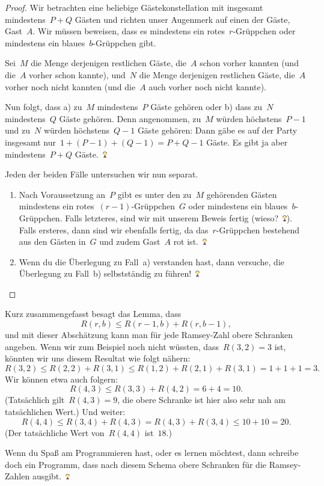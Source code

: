 \documentclass{../../zirkelblatt1718}
\theoremstyle{definition}
\theoremstyle{plain}
\theoremstyle{remark}
\newcommand{\happy}{\includegraphics[height=0.7em]{happy}\xspace}
\begin{document}
\begin{proof}Wir betrachten eine beliebige Gästekonstellation mit insgesamt
mindestens~$P + Q$ Gästen und richten unser Augenmerk auf einen der Gäste,
Gast~$A$. Wir müssen beweisen, dass es mindestens ein rotes~$r$-Grüppchen oder
mindestens ein blaues~$b$-Grüppchen gibt.

Sei~$M$ die Menge derjenigen restlichen Gäste, die~$A$ schon vorher
kannten (und die~$A$ vorher schon kannte), und~$N$ die Menge derjenigen
restlichen Gäste, die~$A$ vorher noch nicht kannten (und die~$A$ auch vorher
noch nicht kannte).

Nun folgt, dass a) zu~$M$ mindestens~$P$ Gäste gehören oder b) dass zu~$N$
mindestens~$Q$ Gäste gehören. Denn angenommen, zu~$M$ würden höchstens~$P-1$
und zu~$N$ würden höchstens~$Q-1$ Gäste gehören: Dann gäbe es auf der Party
insgesamt nur~$1 + (P-1) + (Q-1) = P+Q-1$ Gäste. Es gibt ja aber
mindestens~$P+Q$ Gäste.~\happy

Jeden der beiden Fälle untersuchen wir nun separat.

\begin{enumerate}
\item Nach Voraussetzung an~$P$ gibt es unter den zu~$M$ gehörenden Gästen
mindestens ein rotes~$(r-1)$-Grüppchen~$G$ oder mindestens ein
blaues~$b$-Grüppchen. Falls letzteres, sind wir mit unserem Beweis
fertig (wieso?~\happy). Falls ersteres, dann sind wir ebenfalls fertig, da
das~$r$-Grüppchen bestehend aus den Gästen in~$G$ und zudem Gast~$A$ rot
ist.~\happy
\item Wenn du die Überlegung zu Fall~a) verstanden hast, dann versuche, die
Überlegung zu Fall~b) selbstständig zu führen!~\happy \qedhere
\end{enumerate}
\end{proof}

Kurz zusammengefasst besagt das Lemma, dass
\[ R(r,b) \leq R(r-1,b) + R(r,b-1), \]
und mit dieser Abschätzung kann man für jede Ramsey-Zahl obere Schranken
angeben. Wenn wir zum Beispiel noch nicht wüssten, dass~$R(3,2) = 3$ ist,
könnten wir uns diesem Resultat wie folgt nähern:
\[ R(3,2) \leq R(2,2) + R(3,1) \leq R(1,2) + R(2,1) + R(3,1) =
  1 + 1 + 1 = 3. \]
Wir können etwa auch folgern:
\[ R(4,3) \leq R(3,3) + R(4,2) = 6 + 4 = 10. \]
(Tatsächlich gilt~$R(4,3) = 9$, die obere Schranke ist hier also sehr nah am
tatsächlichen Wert.)
Und weiter:
\[ R(4,4) \leq R(3,4) + R(4,3) = R(4,3) + R(3,4) \leq 10 + 10 = 20. \]
(Der tatsächliche Wert von~$R(4,4)$ ist~$18$.)

Wenn du Spaß am Programmieren hast, oder es lernen möchtest, dann schreibe doch
ein Programm, dass nach diesem Schema obere Schranken für die Ramsey-Zahlen
ausgibt.~\happy
\end{document}
